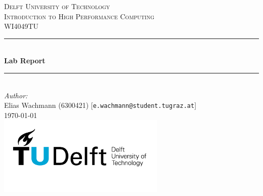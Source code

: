 \documentclass[a4paper]{article}
\begin{document}
\begin{titlepage}

\newcommand{\HRule}{\rule{\linewidth}{0.5mm}} 							%
\center 
 
\textsc{\LARGE Delft University of Technology}\\[1cm]

\textsc{\Large Introduction to High Performance Computing}\\[0.2cm]
\textsc{\large WI4049TU}\\[1cm] 										%
\HRule \\[0.8cm]
{ \huge \bfseries Lab Report}\\[0.7cm]								%
\HRule \\[2cm]
\large
\emph{Author:}\\
Elias Wachmann (6300421) [\texttt{e.wachmann@student.tugraz.at}] \\[1.5cm]  %
{\large \today}\\[5cm]
\includegraphics[width=0.6\textwidth]{../fig/TU_delft_logo.jpg}\\[1cm] 	%
\vfill 
\end{titlepage}


\newpage

\newpage

\newpage

\newpage

\end{document}
